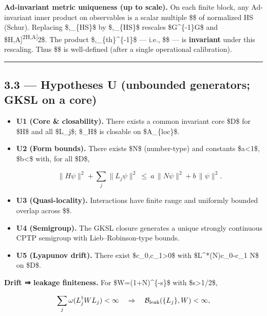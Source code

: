\documentclass[
]{article}
\numberwithin{equation}{section}
\begin{document}
\textbf{Ad-invariant metric uniqueness (up to scale).} On each finite
block, any Ad-invariant inner product on observables is a scalar
multiple \$\alpha\$ of normalized HS (Schur). Replacing
\$\langle\cdot,\cdot\rangle\_\{\rm HS\}\$ by
\$\alpha\langle\cdot,\cdot\rangle\_\{\rm HS\}\$ rescales
\$G\mapsto \alpha\^{}\{-1\}G\$ and
\$\textbar{[}H,A{]}\textbar{}\textsuperscript{2\mapsto \alpha\textbar{[}H,A{]}\textbar{}}2\$.
The product \$\alpha,\lambda\_\{\rm th\}\^{}\{-1\}\$ --- i.e., \$\hbar\$
--- is \textbf{invariant} under this rescaling. Thus \$\hbar\$ is
well-defined (after a single operational calibration).

\begin{center}\rule{0.5\linewidth}{0.5pt}\end{center}

\hypertarget{hypotheses-u-unbounded-generators-gksl-on-a-core}{%
\subsection{3.3 --- Hypotheses U (unbounded generators; GKSL on a
core)}\label{hypotheses-u-unbounded-generators-gksl-on-a-core}}

\begin{itemize}
\item
  \textbf{U1 (Core \& closability).} There exists a common invariant
  core \$\mathcal D\$ for \$H\$ and all \$L\_j\$; \$\delta\_H\$ is
  closable on \$\mathcal A\_\{\rm loc\}\$.
\item
  \textbf{U2 (Form bounds).} There exists \$N\$ (number-type) and
  constants \$a\textless1\$, \$b\textless{}\infty\$ with, for all
  \$\psi\in\mathcal D\$,

  \[
  \|H\psi\|^2+\sum_j\|L_j\psi\|^2\ \le\ a\,\|N\psi\|^2+b\,\|\psi\|^2.
  \]
\item
  \textbf{U3 (Quasi-locality).} Interactions have finite range and
  uniformly bounded overlap across \$\Lambda\$.
\item
  \textbf{U4 (Semigroup).} The GKSL closure generates a unique strongly
  continuous CPTP semigroup with Lieb--Robinson-type bounds.
\item
  \textbf{U5 (Lyapunov drift).} There exist \$c\_0,c\_1\textgreater0\$
  with \$\mathcal L\^{}*(N)\le c\_0-c\_1 N\$ on \$\mathcal D\$.
\end{itemize}

\textbf{Drift ⇒ leakage finiteness.} For \$W=(1+N)\^{}\{-s\}\$ with
\$s\textgreater1/2\$,

\[
\sum_j\omega(L_j^\dagger W L_j)<\infty\quad\Rightarrow\quad \mathcal B_{\rm leak}(\{L_j\},W)<\infty,
\]
\end{document}
